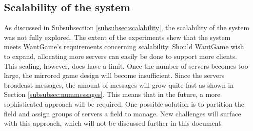 	\subsection{Scalability of the system}
	\label{subsec:scalability_system_discussion}
		As discussed in Subsubsection \ref{subsubsec:scalability}, the scalability of the system was not fully explored. 
		The extent of the experiments shew that the system meets WantGame's requirements concerning scalability. 
		Should WantGame wish to expand, allocating more servers can easily be done to support more clients. 
		This scaling, however, does have a limit. Once the number of servers becomes too large, the mirrored game design will become insufficient.
		Since the servers broadcast messages, the amount of messages will grow quite fast as shown in Section \ref{subsubsec:nummessages}. This means that in the future, a more sophisticated approach will be required. 
		One possible solution is to partition the field and assign groups of servers a field to manage. 
		New challenges will surface with this approach, which will not be discussed further in this document. 